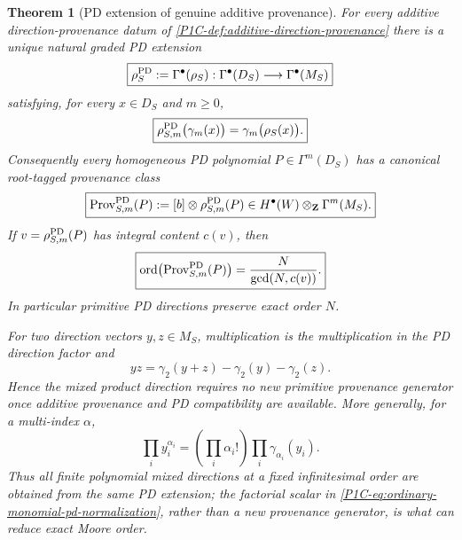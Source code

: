 \documentclass[11pt]{article}
\newtheorem{theorem}{Theorem}[section]
\theoremstyle{remark}
\newcommand{\Z}{\mathbf Z}
\providecommand{\Ord}{\operatorname{Ord}}
\renewcommand{\Ord}{\operatorname{ord}}
\begin{document}
\begin{theorem}[PD extension of genuine additive provenance]\label{P1C-thm:pd-extension-genuine-additive-provenance}
For every additive direction-provenance datum of \cref{P1C-def:additive-direction-provenance} there is a unique natural graded PD extension
\begin{equation}\label{P1C-eq:pd-provenance-extension}
 \boxed{
 \rho_S^{\rm PD}:=\Gamma^\bullet(\rho_S):
 \Gamma^\bullet(D_S)\longrightarrow\Gamma^\bullet(M_S)}
\end{equation}
satisfying, for every $x\in D_S$ and $m\ge0$,
\begin{equation}\label{P1C-eq:pd-provenance-gamma}
 \boxed{
 \rho_{S,m}^{\rm PD}\bigl(\gamma_m(x)\bigr)
 =\gamma_m\bigl(\rho_S(x)\bigr).}
\end{equation}
Consequently every homogeneous PD polynomial $P\in\Gamma^m(D_S)$ has a canonical root-tagged provenance class
\begin{equation}\label{P1C-eq:pd-provenance-class}
 \boxed{
 \operatorname{Prov}^{\rm PD}_{S,m}(P)
 :=[b]\otimes\rho_{S,m}^{\rm PD}(P)
 \in H^\bullet(W)\otimes_\Z\Gamma^m(M_S).}
\end{equation}
If $v=\rho_{S,m}^{\rm PD}(P)$ has integral content $c(v)$, then
\begin{equation}\label{P1C-eq:pd-provenance-order}
 \boxed{
 \Ord\bigl(\operatorname{Prov}^{\rm PD}_{S,m}(P)\bigr)
 =\frac{N}{\gcd(N,c(v))}.}
\end{equation}
In particular primitive PD directions preserve exact order $N$.

For two direction vectors $y,z\in M_S$, multiplication is the multiplication in the PD direction factor and
\begin{equation}\label{P1C-eq:pd-product-from-addition}
 \boxed{
 yz=\gamma_2(y+z)-\gamma_2(y)-\gamma_2(z).}
\end{equation}
Hence the mixed product direction requires no new primitive provenance generator once additive provenance and PD compatibility are available.  More generally, for a multi-index $\alpha$,
\begin{equation}\label{P1C-eq:ordinary-monomial-pd-normalization}
 \boxed{
 \prod_i y_i^{\alpha_i}
 =\left(\prod_i\alpha_i!\right)
  \prod_i\gamma_{\alpha_i}(y_i).}
\end{equation}
Thus all finite polynomial mixed directions at a fixed infinitesimal order are obtained from the same PD extension; the factorial scalar in \eqref{P1C-eq:ordinary-monomial-pd-normalization}, rather than a new provenance generator, is what can reduce exact Moore order.
\end{theorem}
\end{document}
